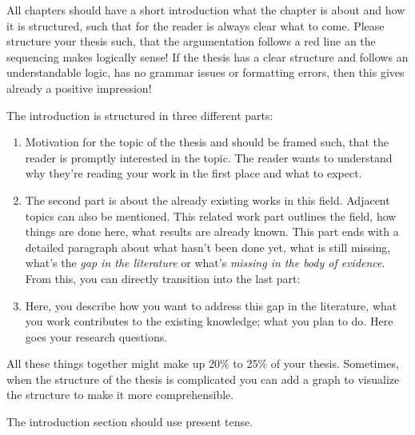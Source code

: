 All chapters should have a short introduction what the chapter is about and how it is structured, such that for the reader is always clear what to come. Please structure your thesis such, that the argumentation follows a red line an the sequencing makes logically sense! If the thesis has a clear structure and follows an understandable logic, has no grammar issues or formatting errors, then this gives already a positive impression! 

The introduction is structured in three different parts:

\begin{enumerate}
    \item Motivation for the topic of the thesis and should be framed such, that the reader is promptly interested in the topic. The reader wants to understand why they're reading your work in the first place and what to expect.
    \item The second part is about the already existing works in this field. Adjacent topics can also be mentioned. This related work part outlines the field, how things are done here, what results are already known. This part ends with a detailed paragraph about what hasn't been done yet, what is still missing, what's the \textit{gap in the literature} or what's \textit{missing in the body of evidence}. From this, you can directly transition into the last part:
    \item Here, you describe how you want to address this gap in the literature, what you work contributes to the existing knowledge; what you plan to do. Here goes your research questions.
\end{enumerate}

All these things together might make up 20\% to 25\% of your thesis.
Sometimes, when the structure of the thesis is complicated you can add a graph to visualize the structure to make it more comprehensible. 

The introduction section should use present tense.